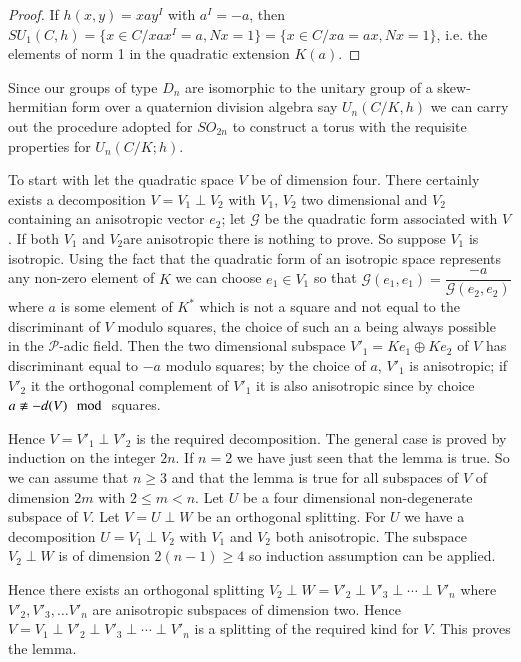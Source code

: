 \begin{proof}
If $h(x,y) = xay^I$ with $a^I = -a$, then $SU_1(C,h) = \{ x \in C/ x a
x^I = a, Nx = 1 \} = \{ x \in C/ xa = ax, Nx = 1 \}$, i.e. the
elements of norm 1 in the quadratic extension $K(a)$. 
\end{proof} 

Since our groups of type $D_n$ are isomorphic to the unitary group of
a skew-hermitian form over a quaternion division algebra say
$U_n(C/K,h)$ we can carry out the procedure adopted for $SO_{2n} $ to
construct a torus with the requisite properties for $U_n(C/K;h)$. 

\setcounter{proofoflem}{2}
\begin{proofoflem} %
To  start with let the quadratic space $V$ be of dimension four. There
certainly exists a decomposition $V= V_1 \perp V_2$ with $V_1$, $V_2$
two dimensional and $V_2$ containing an anisotropic vector $e_2$; let
$\mathscr{G}$ be the quadratic form associated with $V$. If both $V_1$
and $V_2$\pageoriginale are anisotropic there is nothing to prove. So
suppose $V_1$ 
is isotropic. Using the fact that the quadratic form of an isotropic
space represents any non-zero element of $K$ we can choose $e_1 \in
V_1$ so that $ \mathscr{G}(e_1,e_1) =
\dfrac{-a}{\mathscr{G}(e_2,e_2)}$ where $a$ is some element of $K^*$
which is not a square and not equal to the discriminant of $V$ modulo
squares, the choice of such an a being always possible in the
$\mathscr{P}$-adic field. Then the two dimensional subspace $V'_1=
Ke_1 \oplus Ke_2 $ of $V$ has discriminant equal to $-a$ modulo
squares; by the choice of $a$, $V'_1$ is anisotropic; if $V'_2$ it the
orthogonal complement of $V'_1$ it is also anisotropic since by choice
$ a \not\equiv -d(V) \mod$ squares. 
\end{proofoflem}

\noindent
Hence $V = V'_1 \perp V'_2$ is the required decomposition. The general
case is proved by induction on the integer $2n$. If $n=2$ we have just
seen that the lemma is true. So we can assume that $n \geq 3$ and that
the lemma is true for all subspaces of $V$ of dimension $2m$ with $2
\leq m < n$. Let $U$ be a four dimensional non-degenerate subspace of
$V$. Let $V = U \perp W$  be an orthogonal splitting. For $U$ we have
a decomposition $U= V_1 \perp V_2 $ with $V_1$ and $V_2$ both
anisotropic. The subspace $V_2 \perp W$  is of dimension $2(n-1) \geq
4$ so induction assumption can be applied. 

\noindent
Hence there exists an orthogonal splitting $V_2 \perp W = V'_2 \perp
V'_3 \perp \cdots \perp V'_n$ where $V'_2, V'_3, \ldots V'_n$ are
anisotropic subspaces of dimension two. 
Hence $V = V_1 \perp V'_2 \perp V'_3 \perp \cdots \perp V'_n$ is a
splitting of the required kind for $V$. This proves the lemma. 

